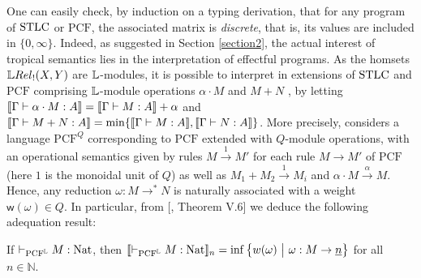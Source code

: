 One can easily check, by induction on a typing derivation, that for any program of $\mathrm{STLC}$ or $\mathrm{PCF}$, the associated matrix is \emph{discrete}, that is, its values are included in $\{0,\infty\}$. Indeed, as suggested in Section \ref{section2}, the actual interest of tropical semantics lies in the interpretation of effectful programs. 
%
As the homsets $\LREL_{!}(X,Y)$ are $\mathbb{L}$-modules, it is possible to interpret in extensions of $\mathrm{STLC}$ and $\mathrm{PCF}$ comprising $\mathbb{L}$-module operations $\alpha \cdot M$ and $M+N$ \cite{Manzo2013}, by 
letting $\llbracket\Gamma \vdash \alpha\cdot M:A\rrbracket=\llbracket\Gamma \vdash M:A\rrbracket+\alpha$ and 
$\llbracket\Gamma \vdash M+N:A\rrbracket=\min\{\llbracket\Gamma \vdash M:A\rrbracket,\llbracket\Gamma \vdash N:A\rrbracket\}$. 
More precisely, \cite{Manzo2013} considers a language $\mathrm{PCF}^{Q}$ corresponding to $\mathrm{PCF}$ extended with $Q$-module operations, with an operational semantics given by rules $M\stackrel{1}{\to}M'$ for each rule $M\to M'$ of $\mathrm{PCF}$ (here $1$ is the monoidal unit of $Q$) as well as 
$M_{1}+M_{2} \stackrel{1}{\to}M_{i}$ and $\alpha\cdot M \stackrel{\alpha}{\to} M $.
Hence, any reduction $\omega: M\to^{*} N$ is naturally associated with a weight $\mathsf w(\omega)\in Q$.
In particular, from [\cite{Manzo2013}, Theorem V.6] we deduce the following adequation result:
\begin{proposition}
If $\vdash_{\mathrm{PCF}^{\mathbb{L}}} M:\mathrm{Nat}$, then $\model{\vdash_{\mathrm{PCF}^{\Lawv}} M:\mathrm{Nat}}_{n}=  \inf\big\{ \mathsf w(\omega) \ \big \vert \ \omega : M \to \underline n\big \}$ for all $n\in \mathbb N$.
\end{proposition}

